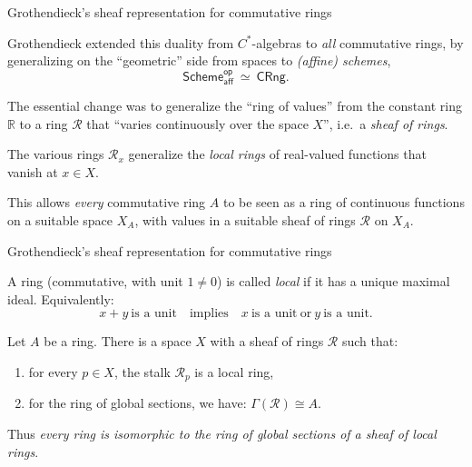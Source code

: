 \documentclass{beamer}
\begin{document}
\begin{frame}{Grothendieck's sheaf representation for commutative rings}

Grothendieck extended this duality from $C^*$-algebras to \emph{all} commutative rings, by generalizing on the ``geometric'' side from spaces to \emph{(affine) schemes},
 \[
\mathsf{Scheme}_\mathsf{aff}^\mathsf{op}\ \simeq\ \mathsf{CRng}.
 \]

The essential change was to generalize the ``ring of values'' from the constant ring $\mathbb{R}$ to a ring $\mathcal{R}$ that ``varies continuously over the space $X$'', i.e.\ a \emph{sheaf of rings}.   
\medskip

The various rings $\mathcal{R}_x$ generalize the \emph{local rings} of real-valued functions that vanish at $x\in X$.
\medskip

This allows \emph{every} commutative ring $A$ to be seen as a ring of continuous functions on a suitable space $X_A$, with values in a suitable sheaf of rings $\mathcal{R}$ on $X_A$.

\end{frame}
\begin{frame}{Grothendieck's sheaf representation for commutative rings}

\begin{definition} A  ring (commutative, with unit $1\neq 0$) is called \emph{local} if it has a unique maximal ideal.
Equivalently: $$x+y\ \text{is a unit}\quad\text{implies}\quad x\ \text{is a unit}\ \text{or}\ y\ \text{is a unit}.$$
\end{definition}
%
\begin{theorem}[Grothendieck]
Let $A$ be a ring.  There is a space $X$ with a sheaf of rings $\mathcal{R}$ such that:
\begin{enumerate}
\item for every $p\in X$, the stalk $\mathcal{R}_p$ is a local ring, 
\item for the ring of global sections, we have: $\Gamma(\mathcal{R}) \cong A$.
\end{enumerate}
Thus \emph{every ring is isomorphic to the ring of global sections of a sheaf of local rings}.
\end{theorem}

\end{frame}
\end{document}
